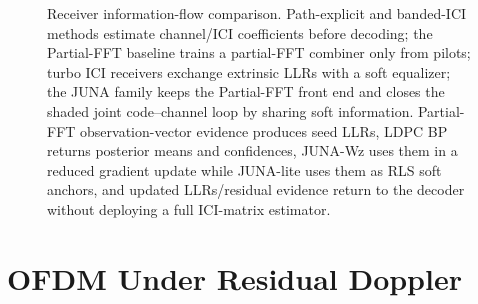 \documentclass[journal]{IEEEtran}
\newcommand{\juna}{JUNA}
\newcommand{\junalite}{JUNA-lite}
\newcommand{\junawz}{JUNA-Wz}
\begin{document}
\begin{figure}[t]
{%
}
\caption{Receiver information-flow comparison. Path-explicit and banded-ICI
methods estimate channel/ICI coefficients before decoding; the Partial-FFT
baseline trains a partial-FFT combiner only from pilots; turbo ICI receivers exchange
extrinsic LLRs with a soft equalizer; the \juna{} family keeps the Partial-FFT
front end and closes the shaded joint code--channel loop by sharing soft
information. Partial-FFT observation-vector evidence produces seed LLRs, LDPC BP returns
posterior means and confidences, \junawz{} uses them in a reduced gradient update
while \junalite{} uses them as RLS soft anchors, and updated LLRs/residual
evidence return to the decoder without deploying a full ICI-matrix estimator.}
\label{fig:method-comparison}
\end{figure}

\section{OFDM Under Residual Doppler}\label{sec:model}
\end{document}
